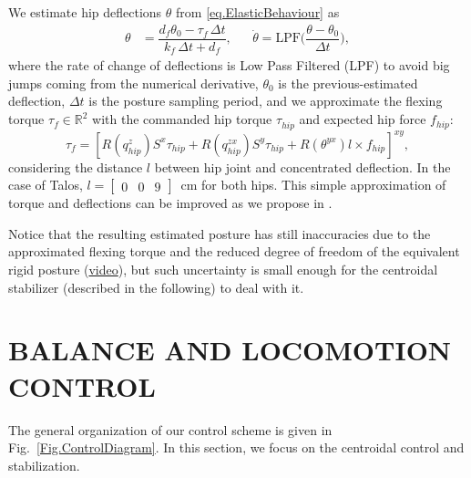 \documentclass[letterpaper, 10 pt, conference]{ieeeconf}  %
\begin{document}
We estimate hip deflections $\theta$ from \eqref{eq.ElasticBehaviour} as  
%
\begin{align}\label{eq. Deflections}
    \theta &= \dfrac{d_f\theta_0 - \tau_f^{ }\,\Delta t}{k_f\,\Delta t+d_f},& & \dot{\theta} = \mathrm{LPF}\bigg(\dfrac{\theta - \theta_0}{\Delta t}\bigg),
\end{align}
%
where the rate of change of deflections is Low Pass Filtered (LPF) to avoid big jumps coming from the numerical derivative, $ \theta_0 $ is the previous-estimated deflection, $\Delta t$ is the posture sampling period, and we approximate the flexing torque $\tau_f^{ }\in \mathbb{R}^2$ with the commanded hip torque $\tau_{hip}^{ }$ and expected hip force $f_\mathit{hip}$:
%
\begin{equation}
    \tau_{f} = \left[R(q_\mathit{hip}^z)S^x\tau_\mathit{hip} + R(q_{hip}^{zx})S^y\tau_\mathit{hip} + R(\theta^{yx})l\times f_\mathit{hip}\right]^{xy},
\end{equation}
%
considering the distance $l$ between hip joint and concentrated deflection. In the case of Talos, $l = [\begin{smallmatrix} 0&0&9 \end{smallmatrix}]$~cm for both hips.
This simple approximation of torque and deflections can be improved as we propose in \cite{Giulio2022_TalosFlex}.

Notice that the resulting estimated posture has still inaccuracies due to the approximated flexing torque and the reduced degree of freedom of the equivalent rigid posture (\href{ https://gepettoweb.laas.fr/articles/talos_centroidal_mpc_torque_control.html}{video}), but such uncertainty is small enough for the centroidal stabilizer (described in the following) to deal with it. 

\section{BALANCE AND LOCOMOTION CONTROL}\label{Sec.BalanceControl}

The general organization of our control scheme is given in Fig.~\ref{Fig.ControlDiagram}.
In this section, we focus on the centroidal control and stabilization.
\end{document}
